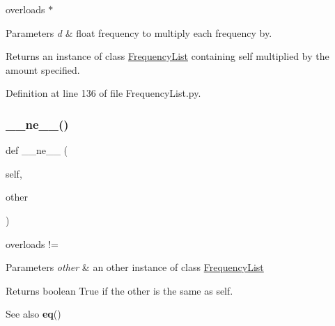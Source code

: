 overloads $\ast$ 


\begin{DoxyParams}{Parameters}
{\em d} & float frequency to multiply each frequency by. \\
\hline
\end{DoxyParams}
\begin{DoxyReturn}{Returns}
an instance of class \hyperlink{classSignalIntegrity_1_1FrequencyDomain_1_1FrequencyList_1_1FrequencyList}{Frequency\+List} containing self multiplied by the amount specified. 
\end{DoxyReturn}


Definition at line 136 of file Frequency\+List.\+py.

\mbox{\label{classSignalIntegrity_1_1FrequencyDomain_1_1FrequencyList_1_1FrequencyList_aa0b54a20b36fcc55e1147de88d083072}} 
\subsubsection{\texorpdfstring{\+\_\+\+\_\+ne\+\_\+\+\_\+()}{\_\_ne\_\_()}}
{\footnotesize\ttfamily def \+\_\+\+\_\+ne\+\_\+\+\_\+ (\begin{DoxyParamCaption}\item[{}]{self,  }\item[{}]{other }\end{DoxyParamCaption})}



overloads != 


\begin{DoxyParams}{Parameters}
{\em other} & an other instance of class \hyperlink{classSignalIntegrity_1_1FrequencyDomain_1_1FrequencyList_1_1FrequencyList}{Frequency\+List} \\
\hline
\end{DoxyParams}
\begin{DoxyReturn}{Returns}
boolean True if the other is the same as self. 
\end{DoxyReturn}
\begin{DoxySeeAlso}{See also}
{\bfseries eq}() 
\end{DoxySeeAlso}


